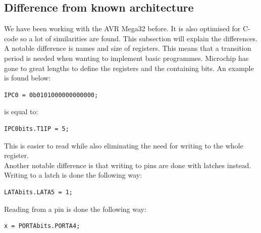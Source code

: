 \subsection{Difference from known architecture}
We have been working with the AVR Mega32 before. It is also optimised for C-code so a lot of similarities are found. This subsection will explain the differences.\\
A notable difference is names and size of registers. This means that a transition period is needed when wanting to implement basic programmes. Microchip has gone to great lengths to define the registers and the containing bits. An example is found below:
\begin{lstlisting}
IPC0 = 0b0101000000000000;
\end{lstlisting} 
is equal to:
\begin{lstlisting}
IPC0bits.T1IP = 5;
\end{lstlisting} 
This is easier to read while also eliminating the need for writing to the whole register.\\
Another notable difference is that writing to pins are done with latches instead. Writing to a latch is done the following way:
\begin{lstlisting}
LATAbits.LATA5 = 1;
\end{lstlisting}
Reading from a pin is done the following way:
\begin{lstlisting}
x = PORTAbits.PORTA4;
\end{lstlisting}